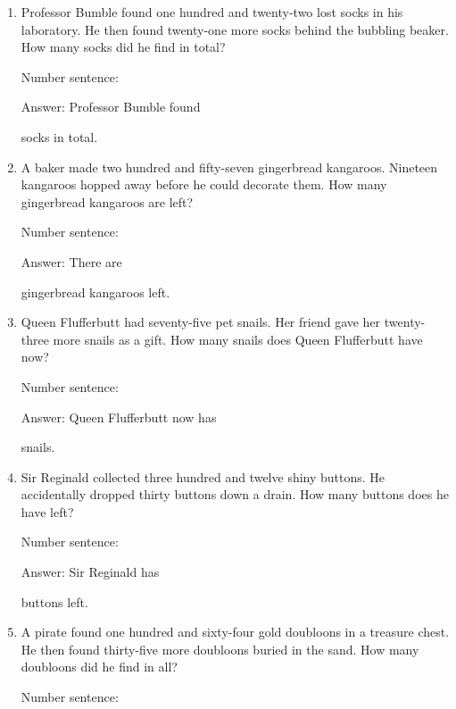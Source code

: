 \documentclass{tufte-book}
\begin{document}
\begin{enumerate}

\item
  Professor Bumble found one hundred and twenty-two lost socks in his
  laboratory. He then found twenty-one more socks behind the bubbling
  beaker. How many socks did he find in total?\medskip\par
  Number sentence:
  \dotfill\medskip\par
  Answer: Professor Bumble found
  \dotfill\medskip\par\mbox{}\dotfill\medskip\par\mbox{}\dotfill\bigskip
  socks in total.
\item
  A baker made two hundred and fifty-seven gingerbread kangaroos.
  Nineteen kangaroos hopped away before he could decorate them. How many
  gingerbread kangaroos are left?\medskip\par
  Number sentence:
  \dotfill\medskip\par
  Answer: There are
  \dotfill\medskip\par\mbox{}\dotfill\medskip\par\mbox{}\dotfill\bigskip
  gingerbread kangaroos left.
\item
  Queen Flufferbutt had seventy-five pet snails. Her friend gave her
  twenty-three more snails as a gift. How many snails does Queen
  Flufferbutt have now?\medskip\par
  Number sentence:
  \dotfill\medskip\par
  Answer: Queen Flufferbutt now has
  \dotfill\medskip\par\mbox{}\dotfill\medskip\par\mbox{}\dotfill\bigskip
  snails.
\item
  Sir Reginald collected three hundred and twelve shiny buttons. He
  accidentally dropped thirty buttons down a drain. How many buttons
  does he have left?\medskip\par
  Number sentence:
  \dotfill\medskip\par
  Answer: Sir Reginald has
  \dotfill\medskip\par\mbox{}\dotfill\medskip\par\mbox{}\dotfill\bigskip
  buttons left.
\item
  A pirate found one hundred and sixty-four gold doubloons in a treasure
  chest. He then found thirty-five more doubloons buried in the sand.
  How many doubloons did he find in all?\medskip\par
  Number sentence:
  \dotfill\medskip\par

\end{enumerate}
\end{document}
